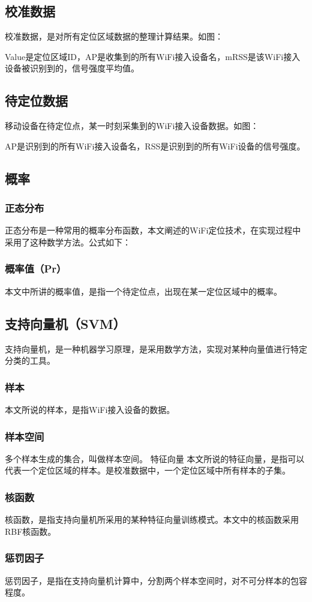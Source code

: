 \documentclass[UTF8, twocolumn ]{ctexart}
\begin{document}
\subsection{校准数据}
校准数据，是对所有定位区域数据的整理计算结果。如图：

Value是定位区域ID，AP是收集到的所有WiFi接入设备名，mRSS是该WiFi接入设备被识别到的，信号强度平均值。
\subsection{待定位数据}
移动设备在待定位点，某一时刻采集到的WiFi接入设备数据。如图：

AP是识别到的所有WiFi接入设备名，RSS是识别到的所有WiFi设备的信号强度。
\subsection{概率}
\subsubsection{正态分布}
正态分布是一种常用的概率分布函数，本文阐述的WiFi定位技术，在实现过程中采用了这种数学方法。公式如下：

\subsubsection{概率值（Pr）}
本文中所讲的概率值，是指一个待定位点，出现在某一定位区域中的概率。
\subsection{支持向量机（SVM）}
支持向量机，是一种机器学习原理，是采用数学方法，实现对某种向量值进行特定分类的工具。
\subsubsection{样本}
本文所说的样本，是指WiFi接入设备的数据。
\subsubsection{样本空间}
多个样本生成的集合，叫做样本空间。
特征向量
本文所说的特征向量，是指可以代表一个定位区域的样本。是校准数据中，一个定位区域中所有样本的子集。
\subsubsection{核函数}
核函数，是指支持向量机所采用的某种特征向量训练模式。本文中的核函数采用RBF核函数。
\subsubsection{惩罚因子}
惩罚因子，是指在支持向量机计算中，分割两个样本空间时，对不可分样本的包容程度。
\end{document}
